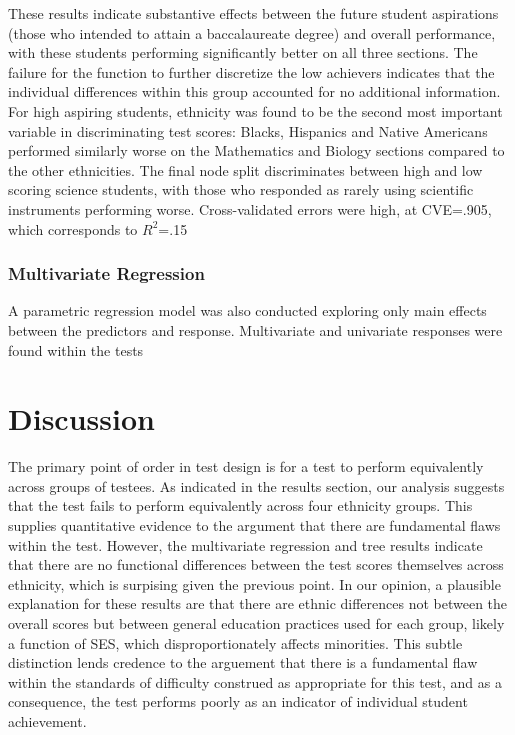 \documentclass{article}\usepackage[]{graphicx}\usepackage[]{color}
\begin{document}
These results indicate substantive effects between the future student aspirations (those who intended to attain a baccalaureate degree) and overall performance, with these students performing significantly better on all three sections. The failure for the function to further discretize the low achievers indicates that the individual differences within this group accounted for no additional information. For high aspiring students, ethnicity was found to be the second most important variable in discriminating test scores: Blacks, Hispanics and Native Americans performed similarly worse on the Mathematics and Biology sections compared to the other ethnicities. The final node split discriminates between high and low scoring science students, with those who responded as rarely using scientific instruments performing worse. Cross-validated errors were high, at CVE=.905, which corresponds to $R^2$=.15

\subsubsection{Multivariate Regression}
A parametric regression model was also conducted exploring only main effects between the predictors and response. Multivariate and univariate responses were found within the tests


\section{Discussion}

The primary point of order in test design is for a test to perform equivalently across groups of testees. As indicated in the results section, our analysis suggests that the test fails to perform equivalently across four ethnicity groups. This supplies quantitative evidence to the argument that there are fundamental flaws within the test. However, the multivariate regression and tree results indicate that there are no functional differences between the test scores themselves across ethnicity, which is surpising given the previous point. In our opinion, a plausible explanation for these results are that there are ethnic differences not between the overall scores but between general education practices used for each group, likely a function of SES, which disproportionately affects minorities. This subtle distinction lends credence to the arguement that there is a fundamental flaw within the standards of difficulty construed as appropriate for this test, and as a consequence, the test performs poorly as an indicator of individual student achievement.
\end{document}
